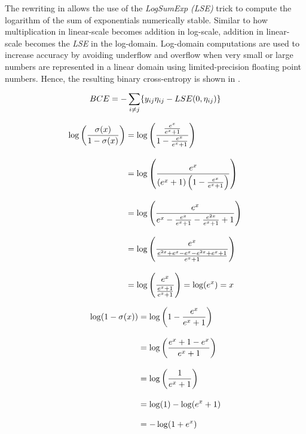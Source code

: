         The rewriting in  allows the use of the \emph{LogSumExp (LSE)} trick to compute the logarithm of the sum of exponentials numerically stable. Similar to how multiplication in linear-scale becomes addition in log-scale, addition in linear-scale becomes the \emph{LSE} in the log-domain. Log-domain computations are used to increase accuracy by avoiding underflow and overflow when very small or large numbers are represented in a linear domain using limited-precision floating point numbers. Hence, the resulting binary cross-entropy is shown in .
        
        \begin{equation}\label{eq:bce-log-domain-rewrite}
            BCE = -\sum_{i\neq j}\{ \sub(y) \sub(\eta) - LSE(0,\sub(\eta)) \}
        \end{equation}
        
        \begin{equation}\label{eq:bce-rewrite-first-full}
            \setlength{\jot}{\baselineskip}
            \begin{split}
                \log\left(\frac{\sigma(x)}{1-\sigma(x)}\right) &= \log\left(\frac{\frac{e^x}{e^x+1}}{1-\frac{e^x}{e^x+1}}\right) \\ &=
                \log\left(\frac{e^x}{(e^x+1)\left(1-\frac{e^x}{e^x+1}\right)}\right) \\ &=
                \log\left(\frac{e^x}{e^x-\frac{e^x}{e^x+1}-\frac{e^{2x}}{e^x+1}+1}\right) \\ &=
                \log\left(\frac{e^x}{\frac{e^{2x}+e^x-e^x-e^{2x}+e^x+1}{e^x+1}}\right) \\ &=
                \log\left(\frac{e^x}{\frac{e^x+1}{e^x+1}}\right) = \log(e^x) = x
            \end{split}
        \end{equation}
        
        \begin{equation}\label{eq:bce-rewrite-second-full}
            \setlength{\jot}{\baselineskip}
            \begin{split}
                \log(1-\sigma(x)) &= \log\left(1-\frac{e^x}{e^x+1}\right)
                \\ &= \log\left(\frac{e^x+1-e^x}{e^x+1}\right)
                \\ &= \log\left(\frac{1}{e^x+1}\right)
                \\ &= \log(1) - \log(e^x+1) \\ &= -\log(1+e^x)
            \end{split}
        \end{equation}
    
